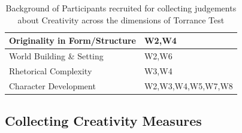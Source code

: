 \begin{table}[!ht]
{\begin{tabular}{ll}
Originality in Form/Structure & W2,W4                  \\ \hline\hline
World Building \& Setting & W2,W6                  \\ \hline
Rhetorical Complexity & W3,W4                  \\ \hline
Character Development & W2,W3,W4,W5,W7,W8                  \\ \hline
\end{tabular}
\vspace{2ex}
\caption{\label{testsource}Background of Participants recruited for collecting judgements about Creativity across the dimensions of Torrance Test}}
\vspace{-5ex}
\end{table}


\subsection{Collecting Creativity Measures}

